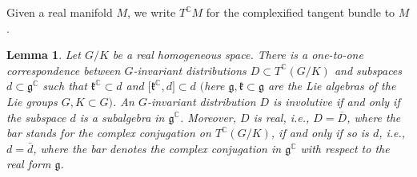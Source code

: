 \documentclass[10pt,a4paper]{amsart}
\numberwithin{equation}{section}
\newtheorem{Lemma}[Theorem]{Lemma}
\begin{document}
Given a real manifold $M$, we write $T^\mathbb{C} M$ for the complexified tangent bundle to $M$.

\begin{Lemma}\label{L3}Let $G/K$ be a real homogeneous space. There is a one-to-one correspondence between $G$-invariant distributions $D \subset T^\mathbb{C}(G/K)$ and subspaces $ d \subset\mathfrak{g}^\mathbb{C}$ such that $\mathfrak{k}^\mathbb{C} \subset d$ and $\big[\mathfrak{k}^\mathbb{C}, d\big]\subset d$ $($here $\mathfrak{g},\mathfrak{k} \subset\mathfrak{g}$ are the Lie algebras of the Lie groups $G, K \subset G)$. An $G$-invariant distribution $D$ is involutive if and only if the subspace $ d$ is a subalgebra in $\mathfrak{g}^\mathbb{C}$. Moreover, $D$ is real, i.e., $D=\overline D$, where the bar stands for the complex conjugation on $T^\mathbb{C}(G/K)$, if and only if so is $ d$, i.e., $d=\bar d$, where the bar denotes the complex conjugation in $\mathfrak{g}^\mathbb{C}$ with respect to the real form $\mathfrak{g}$.
\end{Lemma}
\end{document}
